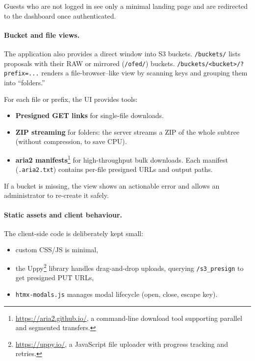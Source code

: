 Guests who are not logged in see only a minimal landing page and are redirected to the dashboard once authenticated.

\paragraph{Bucket and file views.}
The application also provides a direct window into S3 buckets.  
\texttt{/buckets/} lists proposals with their RAW or mirrored (\texttt{/ofed/}) buckets.  
\texttt{/buckets/<bucket>/?prefix=...} renders a file-browser–like view by scanning keys and grouping them into “folders.”  

For each file or prefix, the UI provides tools:  
\begin{itemize}
	\item \textbf{Presigned GET links} for single-file downloads.  
	\item \textbf{ZIP streaming} for folders: the server streams a ZIP of the whole subtree 
	(without compression, to save CPU).  
	\item \textbf{aria2 manifests}\footnote{\url{https://aria2.github.io/}, a command-line download tool supporting parallel and segmented transfers.} 
	for high-throughput bulk downloads. Each manifest (\texttt{.aria2.txt}) contains per-file presigned URLs and output paths.  
\end{itemize}

If a bucket is missing, the view shows an actionable error and allows an administrator to re-create it safely.

\paragraph{Static assets and client behaviour.}
The client-side code is deliberately kept small:  
\begin{itemize}
	\item custom CSS/JS is minimal,  
	\item the Uppy\footnote{\url{https://uppy.io/}, a JavaScript file uploader with progress tracking and retries.} library handles drag-and-drop uploads, 
	querying \texttt{/s3\_presign} to get presigned PUT URLs,  
	\item \texttt{htmx-modals.js} manages modal lifecycle (open, close, escape key).  
\end{itemize}


